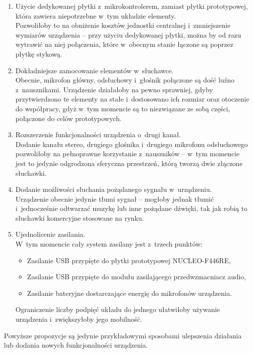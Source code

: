 \begin{enumerate}
	\item Użycie dedykowanej płytki z~mikrokontrolerem, zamiast płytki prototypowej, która zawiera niepotrzebne w~tym układzie elementy.\\
	Pozwoliłoby to na obniżenie kosztów jednostki centralnej i~zmniejszenie wymiarów urządzenia -- przy użyciu dedykowanej płytki, można by od razu wytrawić na niej połączenia, które w~obecnym stanie łączone są poprzez płytkę stykową.
	\item Dokładniejsze zamocowanie elementów w~słuchawce.\\
	Obecnie, mikrofon główny, odsłuchowy i~głośnik połączone są dość luźno z~nausznikami. Urządzenie działałoby na pewno sprawniej, gdyby przytwierdzono te elementy na stałe i~dostosowano ich rozmiar oraz otoczenie do współpracy, gdyż w~tym momencie są to niezwiązane ze sobą części, połączone do celów prototypowych.
	\item Rozszerzenie funkcjonalności urządzenia o~drugi kanał.\\
	Dodanie kanału stereo, drugiego głośnika i~drugiego mikrofonu odsłuchowego pozwoliłoby na pełnoprawne korzystanie z~nauszników -- w~tym momencie jest to jedynie odgrodzona sferyczna przestrzeń, którą tworzą dwie złączone słuchawki.
	\item Dodanie możliwości słuchania pożądanego sygnału w~urządzeniu.\\
	Urządzenie obecnie jedynie tłumi sygnał -- mogłoby jednak tłumić i~jednocześnie odtwarzać muzykę lub inne pożądane dźwięki, tak jak robią to słuchawki komercyjne stosowane na rynku.
	\item Ujednolicenie zasilania.\\
	W~tym momencie cały system zasilany jest z~trzech punktów:
	\begin{itemize}
	\item Zasilanie USB przypięte do płytki prototypowej NUCLEO-F446RE,
	\item Zasilanie USB przypięte do modułu zasilającego przedwzmacniacz audio,
	\item Zasilanie bateryjne dostarczające energię do mikrofonów urządzenia.
	\end{itemize}
	Ograniczenie liczby podpięć układu do jednego ułatwiłoby używanie urządzenia i~zwiększyłoby jego mobilność.
\end{enumerate}

Powyższe propozycje są jedynie przykładowymi sposobami ulepszenia działania lub dodania nowych funkcjonalności urządzenia.
